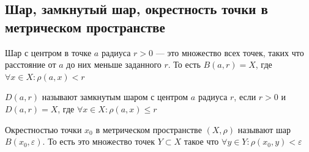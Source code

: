 \newpage
\subsection{Шар, замкнутый шар, окрестность точки в метрическом пространстве}
    \begin{definition}
        Шар с центром в точке $a$ радиуса $r > 0$ --- это множество всех точек, таких что расстояние от $a$ до них меньше заданного $r$. То есть $B(a, r) = X$, где $\forall x \in X : \rho(a, x) < r$
    \end{definition}
    \begin{definition}
        $D(a, r)$ называют замкнутым шаром с центром $a$ радиуса $r$, если $r > 0$ и $D(a, r) = X$, где $\forall x \in X : \rho(a, x) \leq r$
    \end{definition}
    \begin{definition}
        Окрестностью точки $x_0$ в метрическом пространстве $(X, \rho)$ называют шар $B(x_0, \varepsilon)$. То есть это множество точек $Y \subset X$ такое что $\forall y \in Y : \rho(x_0, y) < \varepsilon$
    \end{definition}

\newpage
